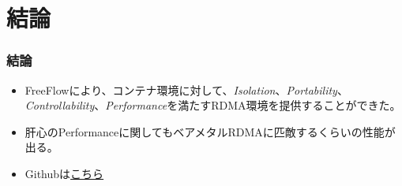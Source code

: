 \documentclass[dvipdfmx,9pt,notheorems]{beamer}
\theoremstyle{definition}
\begin{document}
\section{結論}
\begin{frame}\frametitle{結論}
	\begin{itemize}
    \item FreeFlowにより、コンテナ環境に対して、\textit{Isolation}、\textit{Portability}、\textit{Controllability}、\textit{Performance}を満たすRDMA環境を提供することができた。
  	\item 肝心のPerformanceに関してもベアメタルRDMAに匹敵するくらいの性能が出る。
		\item Githubは\href{https://github.com/microsoft/Freeflow}{こちら}
	\end{itemize}
\end{frame}

\setcounter{finalframe}{\value{framenumber}}
\setcounter{framenumber}{\value{finalframe}}
\end{document}
